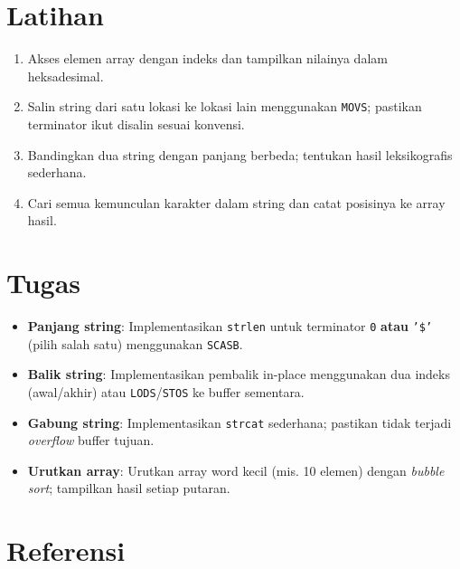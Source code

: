 \section{Latihan}
\begin{enumerate}
  \item Akses elemen array dengan indeks dan tampilkan nilainya dalam heksadesimal.
  \item Salin string dari satu lokasi ke lokasi lain menggunakan \texttt{MOVS}; pastikan terminator ikut disalin sesuai konvensi.
  \item Bandingkan dua string dengan panjang berbeda; tentukan hasil leksikografis sederhana.
  \item Cari semua kemunculan karakter dalam string dan catat posisinya ke array hasil.
\end{enumerate}

\section{Tugas}
\begin{itemize}
  \item \textbf{Panjang string}: Implementasikan \texttt{strlen} untuk terminator \texttt{0} \textbf{atau} \texttt{'{\$}'} (pilih salah satu) menggunakan \texttt{SCASB}.
  \item \textbf{Balik string}: Implementasikan pembalik in-place menggunakan dua indeks (awal/akhir) atau \texttt{LODS}/\texttt{STOS} ke buffer sementara.
  \item \textbf{Gabung string}: Implementasikan \texttt{strcat} sederhana; pastikan tidak terjadi \textit{overflow} buffer tujuan.
  \item \textbf{Urutkan array}: Urutkan array word kecil (mis. 10 elemen) dengan \textit{bubble sort}; tampilkan hasil setiap putaran.
\end{itemize}

\section{Referensi}
